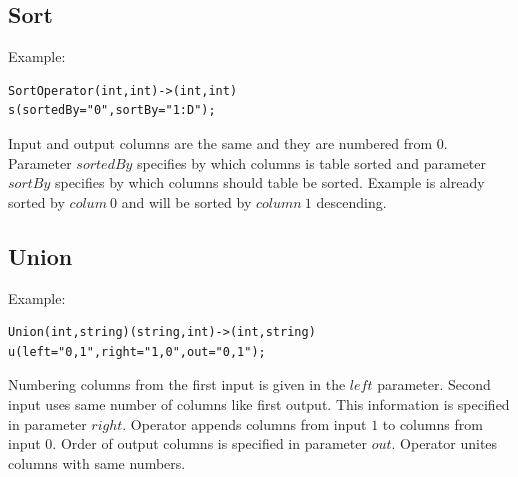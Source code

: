\subsection{Sort}
Example:
\begin{lstlisting}
SortOperator(int,int)->(int,int)
s(sortedBy="0",sortBy="1:D");
\end{lstlisting}
Input and output columns are the same and they are numbered from 0. Parameter $sortedBy$ specifies by which columns is table sorted and parameter $sortBy$ specifies by which columns should table be sorted. Example is already sorted by $colum~0$ and will be sorted by $column~1$ descending.


\subsection{Union}
Example:
\begin{lstlisting}
Union(int,string)(string,int)->(int,string)
u(left="0,1",right="1,0",out="0,1");
\end{lstlisting}
Numbering columns from the first input is given in the $left$ parameter. Second input uses same number of columns like first output. This information is specified in parameter $right$. Operator appends columns from input $1$ to columns from input $0$. Order of output columns is specified in parameter $out$. Operator unites columns with same numbers.

